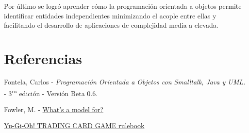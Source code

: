 	Por último se logró aprender cómo la programación orientada a objetos permite identificar entidades independientes minimizando el acople entre ellas y facilitando el desarrollo de aplicaciones de complejidad media a elevada.
	
	\appendix
	\section{Referencias}
	\begingroup
	\renewcommand{\section}[2]{}
	\begin{thebibliography}{10}
		 Fontela, Carlos - \emph{Programación Orientada a Objetos con Smalltalk, Java y UML.} - 3\textsuperscript{ra} edición - Versión Beta 0.6.
		
		 Fowler, M. - \hyperref{https://martinfowler.com/distributedComputing/purpose.pdf}{}{}{What's a model for?}
		
		 \hyperref{https://www.yugioh-card.com/en/rulebook/SD_RuleBook_EN_10.pdf}{}{}{Yu-Gi-Oh! TRADING CARD GAME rulebook}
	\end{thebibliography}
	\endgroup
	

